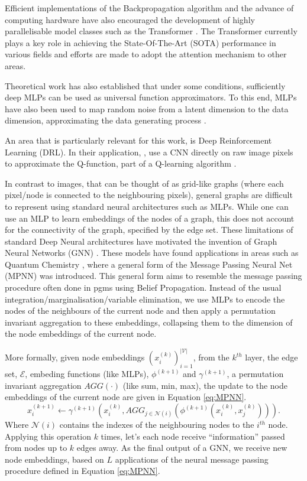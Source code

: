 \documentclass{report}
\numberwithin{equation}{section}
\numberwithin{figure}{section}
\numberwithin{table}{section}
\numberwithin{algorithm}{section}
\begin{document}
Efficient implementations \citep{PyTorch,tensorflow} 
of the Backpropagation algorithm \citep{backprop} and the 
advance of computing 
hardware have also encouraged the development of highly parallelisable 
model classes such as the Transformer \citep{transformers}. The 
Transformer currently plays a key role in achieving the 
State-Of-The-Art (SOTA) performance 
in various fields and efforts are made to adopt the attention 
mechanism to other areas.

Theoretical work \citep{UnivApproxNN} has also established
that under some conditions, sufficiently deep MLPs 
can be used as universal function approximators. To this end, 
MLPs have also been used to map random noise from a latent 
dimension to the data dimension, approximating 
the data generating process \citep{goodfellow2014generative,VAEs}.

An area that is particularly relevant for this work, 
is Deep Reinforcement Learning 
(DRL). In their application, \cite{DQN}, use a CNN directly on 
raw image pixels to approximate the Q-function, part of a 
Q-learning algorithm \citep{QlearningWatkins1992}. 

In contrast to images, that can be thought of as grid-like graphs 
(where each pixel/node is connected to the neighbouring pixels), 
general graphs are difficult to represent using standard 
neural architectures such as MLPs. While one can use an MLP 
to learn embeddings of the nodes of a graph, this does not 
account for the connectivity of the graph, specified by the edge set. 
These limitations of standard Deep Neural architectures 
have motivated the invention of Graph Neural Networks (GNN) \citep{ScarselliGNN}. 
These models have found applications in areas such as 
Quantum Chemistry \citep{MPNNs}, where 
a general form of the Message Passing Neural Net (MPNN) was 
introduced. This general form aims to resemble the message passing 
procedure often done in pgms using Belief Propagation. Instead 
of the usual integration/marginalisation/variable elimination, 
we use MLPs to encode the nodes of the neighbours of the current 
node and then apply a permutation invariant aggregation to 
these embeddings, collapsing them to the dimension of the node 
embeddings of the current node.

More formally, given node embeddings $(x_i^{(k)})_{i=1}^{|\mathcal{V}|}$, 
from the $k^{th}$ layer, the edge set, $\mathcal{E}$, embeding 
functions (like MLPs), $\phi^{(k+1)}$ and $\gamma^{(k+1)}$, 
a permutation invariant 
aggregation $AGG(\cdot)$ (like sum, min, max), the update to 
the node embeddings of the current node are given in Equation 
\ref{eq:MPNN}.
\begin{equation}\label{eq:MPNN}
  x_i^{(k+1)}\gets \gamma^{(k+1)}\left(
    x_i^{(k)}, 
    AGG_{j\in\mathcal{N}(i)}\left(
      \phi^{(k+1)}\left(x_i^{(k)}, x_j^{(k)}\right)\right)
  \right).
\end{equation}
Where $\mathcal{N}(i)$ contains the indexes of the neighbouring nodes 
to the $i^{th}$ node. Applying this operation $k$ times, let's 
each node receive ``information'' passed from nodes up to 
$k$ edges away. As the final output of a GNN, we receive 
new node embeddings, based on $L$ applications of the neural 
message passing procedure defined in Equation \ref{eq:MPNN}.
\end{document}
